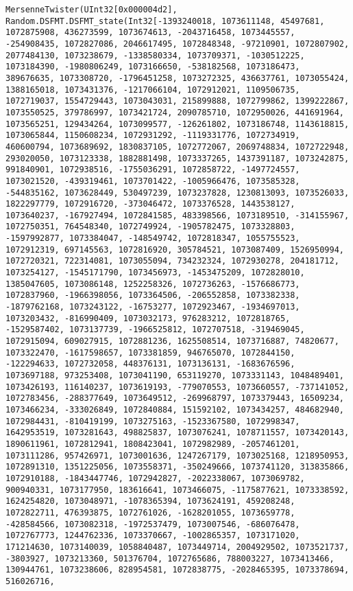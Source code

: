 \documentclass[11pt]{article}
\begin{document}
\begin{verbatim}
MersenneTwister(UInt32[0x000004d2], Random.DSFMT.DSFMT_state(Int32[-1393240018, 1073611148, 45497681, 1072875908, 436273599, 1073674613, -2043716458, 1073445557, -254908435, 1072827086, 2046617495, 1072848348, -97210901, 1072807902, 2077484130, 1073238679, -1338580334, 1073709371, -1030512225, 1073184390, -1980806249, 1073166650, -538182568, 1073186473, 389676635, 1073308720, -1796451258, 1073272325, 436637761, 1073055424, 1388165018, 1073431376, -1217066104, 1072912021, 1109506735, 1072719037, 1554729443, 1073043031, 215899888, 1072799862, 1399222867, 1073550525, 379786997, 1073421724, 2090785710, 1072950026, 441691964, 1073565251, 129434264, 1073099577, -126261802, 1073186748, 1143618815, 1073065844, 1150608234, 1072931292, -1119331776, 1072734919, 460600794, 1073689692, 1830837105, 1072772067, 2069748834, 1072722948, 293020050, 1073123338, 1882881498, 1073337265, 1437391187, 1073242875, 991840901, 1072938516, -1755036291, 1072858722, -1497724557, 1073021520, -439319461, 1073701422, -1005966476, 1073585328, -544835162, 1073628449, 530497239, 1073237828, 1230813093, 1073526033, 1822297779, 1072916720, -373046472, 1073376528, 1443538127, 1073640237, -167927494, 1072841585, 483398566, 1073189510, -314155967, 1072750351, 764548340, 1072749924, -1905782475, 1073328803, -1597992877, 1073384047, -148549742, 1072818347, 1055755523, 1072912319, 697145563, 1072816920, 305784521, 1073087409, 1526950994, 1072720321, 722314081, 1073055094, 734232324, 1072930278, 204181712, 1073254127, -1545171790, 1073456973, -1453475209, 1072828010, 1385047605, 1073086148, 1252258326, 1072736263, -1576686773, 1072837960, -1966398056, 1073364506, -206552858, 1073382338, -1879762168, 1073243122, -16753277, 1072923467, -1934697013, 1073203432, -816990409, 1073032173, 976283212, 1072818765, -1529587402, 1073137739, -1966525812, 1072707518, -319469045, 1072915094, 609027915, 1072881236, 1625508514, 1073716887, 74820677, 1073322470, -1617598657, 1073381859, 946765070, 1072844150, -122294633, 1072732058, 448376131, 1073136131, -1683676596, 1073697188, 973253408, 1073041190, 653119270, 1073331143, 1048489401, 1073426193, 116140237, 1073619193, -779070553, 1073660557, -737141052, 1072783456, -288377649, 1073649512, -269968797, 1073379443, 16509234, 1073466234, -333026849, 1072840884, 151592102, 1073434257, 484682940, 1072984431, -810419199, 1073275163, -1523367580, 1072998347, 1642953519, 1073281643, 498825837, 1073076241, 1078711557, 1073420143, 1890611961, 1072812941, 1808423041, 1072982989, -2057461201, 1073111286, 957426971, 1073001636, 1247267179, 1073025168, 1218950953, 1072891310, 1351225056, 1073558371, -350249666, 1073741120, 313835866, 1072910188, -1843447746, 1072942827, -2022338067, 1073069782, 900940331, 1073177950, 183616641, 1073466075, -1175877621, 1073338592, 1624254820, 1073048971, -1078365394, 1073624191, 459208248, 1072822711, 476393875, 1072761026, -1628201055, 1073659778, -428584566, 1073082318, -1972537479, 1073007546, -686076478, 1072767773, 1244762336, 1073370667, -1002865357, 1073171020, 171214630, 1073140039, 1058840487, 1073449714, 2004929502, 1073521737, -3803927, 1073213360, 501376704, 1072765686, 788003227, 1073413466, 130944761, 1073238606, 828954581, 1072838775, -2028465395, 1073378694, 516026716, 
\end{verbatim}
\end{document}
